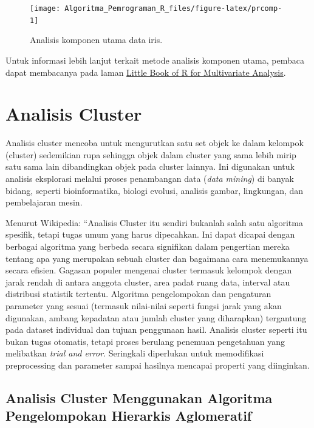 \documentclass[
]{book}
\theoremstyle{definition}
\theoremstyle{definition}
\theoremstyle{definition}
\theoremstyle{definition}
\theoremstyle{remark}
\begin{document}
\begin{figure}

{\centering \texttt{[image: Algoritma\_Pemrograman\_R\_files/figure-latex/prcomp-1]} 

}

\caption{Analisis komponen utama data iris.}\label{fig:prcomp}
\end{figure}

Untuk informasi lebih lanjut terkait metode analisis komponen utama, pembaca dapat membacanya pada laman \href{https://little-book-of-r-for-multivariate-analysis.readthedocs.io/en/latest/}{Little Book of R for Multivariate Analysis}.

\hypertarget{analisis-cluster}{%
\section{Analisis Cluster}\label{analisis-cluster}}

Analisis cluster mencoba untuk mengurutkan satu set objek ke dalam kelompok (cluster) sedemikian rupa sehingga objek dalam cluster yang sama lebih mirip satu sama lain dibandingkan objek pada cluster lainnya. Ini digunakan untuk analisis eksplorasi melalui proses penambangan data (\emph{data mining}) di banyak bidang, seperti bioinformatika, biologi evolusi, analisis gambar, lingkungan, dan pembelajaran mesin.

Menurut Wikipedia: ``Analisis Cluster itu sendiri bukanlah salah satu algoritma spesifik, tetapi tugas umum yang harus dipecahkan. Ini dapat dicapai dengan berbagai algoritma yang berbeda secara signifikan dalam pengertian mereka tentang apa yang merupakan sebuah cluster dan bagaimana cara menemukannya secara efisien. Gagasan populer mengenai cluster termasuk kelompok dengan jarak rendah di antara anggota cluster, area padat ruang data, interval atau distribusi statistik tertentu. Algoritma pengelompokan dan pengaturan parameter yang sesuai (termasuk nilai-nilai seperti fungsi jarak yang akan digunakan, ambang kepadatan atau jumlah cluster yang diharapkan) tergantung pada dataset individual dan tujuan penggunaan hasil. Analisis cluster seperti itu bukan tugas otomatis, tetapi proses berulang penemuan pengetahuan yang melibatkan \emph{trial and error}. Seringkali diperlukan untuk memodifikasi preprocessing dan parameter sampai hasilnya mencapai properti yang diinginkan.

\hypertarget{analisis-cluster-menggunakan-algoritma-pengelompokan-hierarkis-aglomeratif}{%
\subsection{Analisis Cluster Menggunakan Algoritma Pengelompokan Hierarkis Aglomeratif}\label{analisis-cluster-menggunakan-algoritma-pengelompokan-hierarkis-aglomeratif}}
\end{document}
